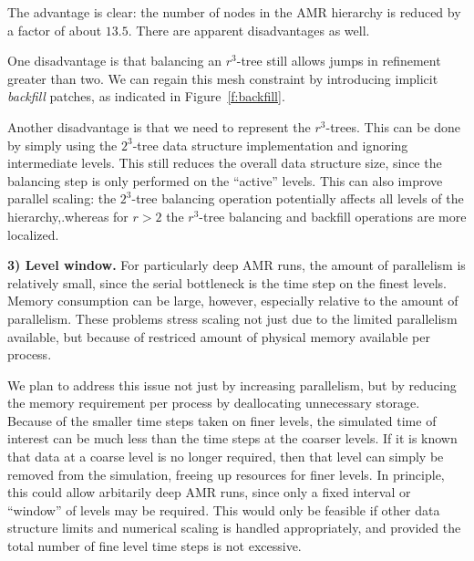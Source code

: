 \documentclass[10pt,twocolumn]{article}
\begin{document}
The advantage is clear: the number of nodes in the AMR hierarchy is
reduced by a factor of about $13.5$.  There are apparent disadvantages
as well.

One disadvantage is that balancing an $r^3$-tree still allows jumps in
refinement greater than two.  We can regain this mesh constraint by
introducing implicit \textit{backfill} patches, as indicated in
Figure~\ref{f:backfill}.



Another disadvantage is that we need to represent the $r^3$-trees.
This can be done by simply using the $2^3$-tree data structure
implementation and ignoring intermediate levels.  This still reduces
the overall data structure size, since the balancing step is only
performed on the ``active'' levels.  This can also improve parallel
scaling: the $2^3$-tree balancing operation potentially affects all
levels of the hierarchy,.whereas for $r>2$ the $r^3$-tree balancing
and backfill operations are more localized.


\textbf{3) Level window.}  For particularly deep AMR runs, the
amount of parallelism is relatively small, since the serial bottleneck
is the time step on the finest levels.  Memory consumption can be
large, however, especially relative to the amount of parallelism.
These problems stress scaling not just due to the limited parallelism
available, but because of restriced amount of physical memory
available per process.

We plan to address this issue not just by increasing parallelism, but
by reducing the memory requirement per process by deallocating
unnecessary storage.  Because of the smaller time steps taken on finer
levels, the simulated time of interest can be much less than the time
steps at the coarser levels.  If it is known that data at a coarse
level is no longer required, then that level can simply be removed
from the simulation, freeing up resources for finer levels.  In
principle, this could allow arbitarily deep AMR runs, since only a
fixed interval or ``window'' of levels may be required.  This would
only be feasible if other data structure limits and numerical scaling
is handled appropriately, and provided the total number of fine level
time steps is not excessive.
\end{document}
